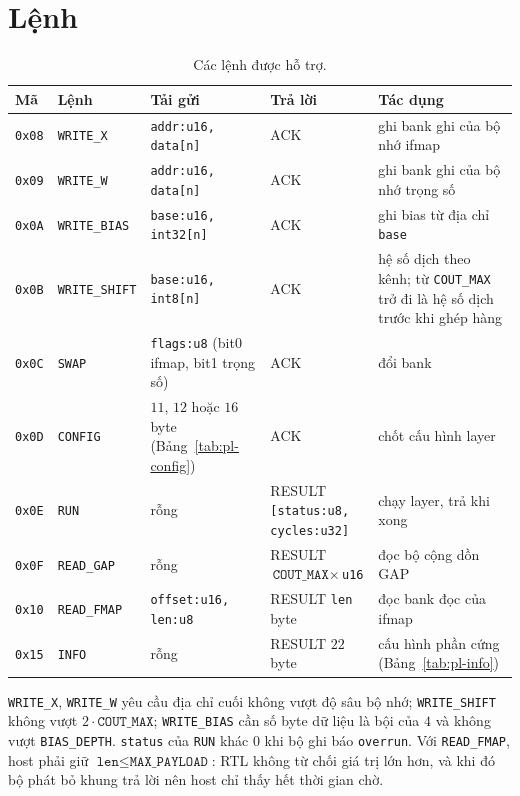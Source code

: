 \section*{Lệnh}
\begin{table}[H]\centering
\caption{Các lệnh được hỗ trợ.}\label{tab:pl-lenh}
\footnotesize\setlength{\tabcolsep}{4pt}
\begin{tabular}{@{}l l >{\raggedright\arraybackslash}p{3.5cm}>{\raggedright\arraybackslash}p{2.8cm}>{\raggedright\arraybackslash}p{3.8cm}@{}}
\toprule
Mã & Lệnh & Tải gửi & Trả lời & Tác dụng \\ \midrule
\texttt{0x08} & \texttt{WRITE\_X} & \texttt{addr:u16, data[n]} & ACK & ghi bank ghi của bộ nhớ ifmap \\
\texttt{0x09} & \texttt{WRITE\_W} & \texttt{addr:u16, data[n]} & ACK & ghi bank ghi của bộ nhớ trọng số \\
\texttt{0x0A} & \texttt{WRITE\_BIAS} & \texttt{base:u16, int32[n]} & ACK & ghi bias từ địa chỉ \texttt{base} \\
\texttt{0x0B} & \texttt{WRITE\_SHIFT} & \texttt{base:u16, int8[n]} & ACK & hệ số dịch theo kênh; từ \texttt{COUT\_MAX} trở đi là hệ số dịch trước khi ghép hàng \\
\texttt{0x0C} & \texttt{SWAP} & \texttt{flags:u8} (bit0 ifmap, bit1 trọng số) & ACK & đổi bank \\
\texttt{0x0D} & \texttt{CONFIG} & $11$, $12$ hoặc $16$ byte (Bảng~\ref{tab:pl-config}) & ACK & chốt cấu hình layer \\
\texttt{0x0E} & \texttt{RUN} & rỗng & RESULT \texttt{[status:u8, cycles:u32]} & chạy layer, trả khi xong \\
\texttt{0x0F} & \texttt{READ\_GAP} & rỗng & RESULT $\texttt{COUT\_MAX}\times$\texttt{u16} & đọc bộ cộng dồn GAP \\
\texttt{0x10} & \texttt{READ\_FMAP} & \texttt{offset:u16, len:u8} & RESULT \texttt{len} byte & đọc bank đọc của ifmap \\
\texttt{0x15} & \texttt{INFO} & rỗng & RESULT $22$ byte & cấu hình phần cứng (Bảng~\ref{tab:pl-info}) \\ \bottomrule
\end{tabular}
\end{table}

\texttt{WRITE\_X}, \texttt{WRITE\_W} yêu cầu địa chỉ cuối không vượt độ sâu bộ nhớ; \texttt{WRITE\_SHIFT} không vượt $2\cdot\texttt{COUT\_MAX}$; \texttt{WRITE\_BIAS} cần số byte dữ liệu là bội của $4$ và không vượt \texttt{BIAS\_DEPTH}.
\texttt{status} của \texttt{RUN} khác $0$ khi bộ ghi báo \texttt{overrun}.
Với \texttt{READ\_FMAP}, host phải giữ $\texttt{len}\le\texttt{MAX\_PAYLOAD}$: RTL không từ chối giá trị lớn hơn, và khi đó bộ phát bỏ khung trả lời nên host chỉ thấy hết thời gian chờ.

